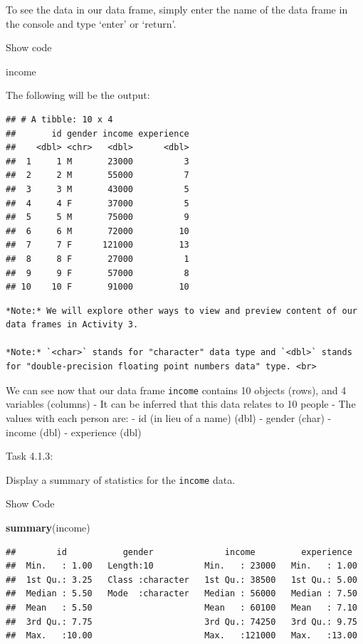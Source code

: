 \documentclass[
]{article}
\newenvironment{Shaded}{\begin{snugshade}}{\end{snugshade}}
\newcommand{\FunctionTok}[1]{\textcolor[rgb]{0.13,0.29,0.53}{\textbf{#1}}}
\newcommand{\NormalTok}[1]{#1}
\begin{document}
To see the data in our data frame, simply enter the name of the data
frame in the console and type `enter' or `return'.

Show code

\begin{Shaded}
\begin{Highlighting}[]
\NormalTok{income}
\end{Highlighting}
\end{Shaded}

The following will be the output:

\begin{verbatim}
## # A tibble: 10 x 4
##       id gender income experience
##    <dbl> <chr>   <dbl>      <dbl>
##  1     1 M       23000          3
##  2     2 M       55000          7
##  3     3 M       43000          5
##  4     4 F       37000          5
##  5     5 M       75000          9
##  6     6 M       72000         10
##  7     7 F      121000         13
##  8     8 F       27000          1
##  9     9 F       57000          8
## 10    10 F       91000         10
\end{verbatim}

\begin{verbatim}
*Note:* We will explore other ways to view and preview content of our data frames in Activity 3.

*Note:* `<char>` stands for "character" data type and `<dbl>` stands for "double-precision floating point numbers data" type. <br>
\end{verbatim}

We can see now that our data frame \texttt{income} contains 10 objects
(rows), and 4 variables (columns) - It can be inferred that this data
relates to 10 people - The values with each person are: - id (in lieu of
a name) (dbl) - gender (char) - income (dbl) - experience (dbl)

Task 4.1.3:

Display a summary of statistics for the \texttt{income} data.

Show Code

\begin{Shaded}
\begin{Highlighting}[]
\FunctionTok{summary}\NormalTok{(income)}
\end{Highlighting}
\end{Shaded}

\begin{verbatim}
##        id           gender              income         experience   
##  Min.   : 1.00   Length:10          Min.   : 23000   Min.   : 1.00  
##  1st Qu.: 3.25   Class :character   1st Qu.: 38500   1st Qu.: 5.00  
##  Median : 5.50   Mode  :character   Median : 56000   Median : 7.50  
##  Mean   : 5.50                      Mean   : 60100   Mean   : 7.10  
##  3rd Qu.: 7.75                      3rd Qu.: 74250   3rd Qu.: 9.75  
##  Max.   :10.00                      Max.   :121000   Max.   :13.00
\end{verbatim}
\end{document}
